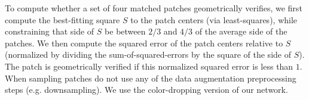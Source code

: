 \documentclass[10pt,twocolumn,letterpaper]{article}
\begin{document}

 To compute whether a set of four matched patches geometrically verifies, we first compute the best-fitting square $S$ to the patch centers (via least-squares), while constraining that side of $S$ be between $2/3$ and $4/3$ of the average side of the patches.  We then compute the squared error of the patch centers relative to $S$ (normalized by dividing the sum-of-squared-errors by the square of the side of $S$).  The patch is geometrically verified if this normalized squared error is less than $1$.  When sampling patches do not use any of the data augmentation preprocessing steps (e.g. downsampling).  We use the color-dropping version of our network. 
\end{document}
